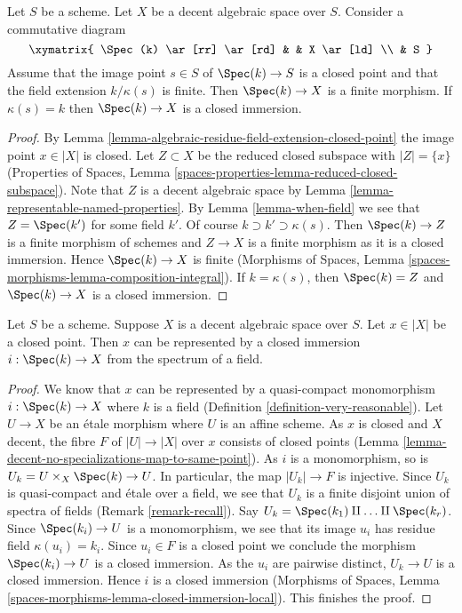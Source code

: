 \begin{lemma}
\label{lemma-finite-residue-field-extension-finite}
Let $S$ be a scheme. Let $X$ be a decent algebraic space over $S$.
Consider a commutative diagram
$$
\xymatrix{
\Spec(k) \ar[rr] \ar[rd] & & X \ar[ld] \\
& S
}
$$
Assume that the image point $s \in S$ of $\Spec(k) \to S$ is
a closed point and that the field extension $k/\kappa(s)$ is finite.
Then $\Spec(k) \to X$ is a finite morphism. If $\kappa(s) = k$
then $\Spec(k) \to X$ is a closed immersion.
\end{lemma}

\begin{proof}
By Lemma \ref{lemma-algebraic-residue-field-extension-closed-point}
the image point $x \in |X|$ is closed. Let $Z \subset X$ be the
reduced closed subspace with $|Z| = \{x\}$ (Properties of Spaces,
Lemma \ref{spaces-properties-lemma-reduced-closed-subspace}).
Note that $Z$ is a decent algebraic space by
Lemma \ref{lemma-representable-named-properties}.
By Lemma \ref{lemma-when-field} we see that $Z = \Spec(k')$
for some field $k'$. Of course $k \supset k' \supset \kappa(s)$.
Then $\Spec(k) \to Z$ is a finite morphism of schemes
and $Z \to X$ is a finite morphism as it is a closed immersion.
Hence $\Spec(k) \to X$ is finite (Morphisms of Spaces, Lemma
\ref{spaces-morphisms-lemma-composition-integral}).
If $k = \kappa(s)$, then $\Spec(k) = Z$ and $\Spec(k) \to X$
is a closed immersion.
\end{proof}

\begin{lemma}
\label{lemma-decent-space-closed-point}
Let $S$ be a scheme. Suppose $X$ is a decent algebraic space over $S$.
Let $x \in |X|$ be a closed point. Then $x$ can be represented by a
closed immersion $i : \Spec(k) \to X$ from the spectrum of a field.
\end{lemma}

\begin{proof}
We know that $x$ can be represented by a quasi-compact monomorphism
$i : \Spec(k) \to X$ where $k$ is a field
(Definition \ref{definition-very-reasonable}).
Let $U \to X$ be an \'etale morphism where $U$ is an affine scheme.
As $x$ is closed and $X$ decent, the fibre $F$ of $|U| \to |X|$ over $x$
consists of closed points
(Lemma \ref{lemma-decent-no-specializations-map-to-same-point}).
As $i$ is a monomorphism, so is $U_k = U \times_X \Spec(k) \to U$.
In particular, the map $|U_k| \to F$ is injective. Since $U_k$
is quasi-compact and \'etale over a field, we see that $U_k$ is a
finite disjoint union of spectra of fields (Remark \ref{remark-recall}).
Say $U_k = \Spec(k_1) \amalg \ldots \amalg \Spec(k_r)$.
Since $\Spec(k_i) \to U$ is a monomorphism, we see that
its image $u_i$ has residue field $\kappa(u_i) = k_i$.
Since $u_i \in F$ is a closed point we conclude the morphism
$\Spec(k_i) \to U$ is a closed immersion. As the $u_i$ are pairwise distinct,
$U_k \to U$ is a closed immersion. Hence $i$ is a closed immersion
(Morphisms of Spaces, Lemma
\ref{spaces-morphisms-lemma-closed-immersion-local}). This finishes the proof.
\end{proof}





